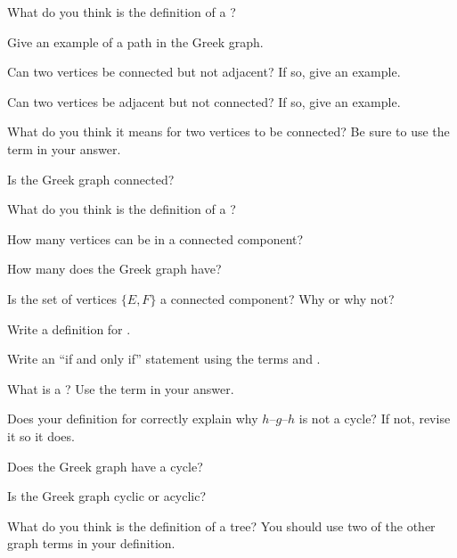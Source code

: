 \documentclass{tufte-handout}
\begin{document}
\begin{questions}
\item What do you think is the definition of a ?
\item Give an example of a path in the Greek graph.
\item Can two vertices be connected but not adjacent?  If so, give an
  example.
\item Can two vertices be adjacent but not connected?  If so, give an
  example.
\item What do you think it means for two vertices to be connected?  Be
  sure to use the term  in your answer.
\item Is the Greek graph connected?
\item What do you think is the definition of a ?
\item How many vertices can be in a connected component?
\item How many  does the Greek graph have?
\item Is the set of vertices $\{E, F\}$ a connected component?  Why or
  why not?
\item Write a definition for .
\item Write an ``if and only if'' statement using the terms
   and .
\item What is a ?  Use the term  in your
  answer.
\item Does your definition for  correctly explain why
  $h$--$g$--$h$ is not a cycle?  If not, revise it so it does.
  \newpage
\item Does the Greek graph have a cycle?
\item Is the Greek graph cyclic or acyclic?
\item What do you think is the definition of a tree?  You should use
  two of the other graph terms in your
  definition.
\end{questions}
\end{document}
